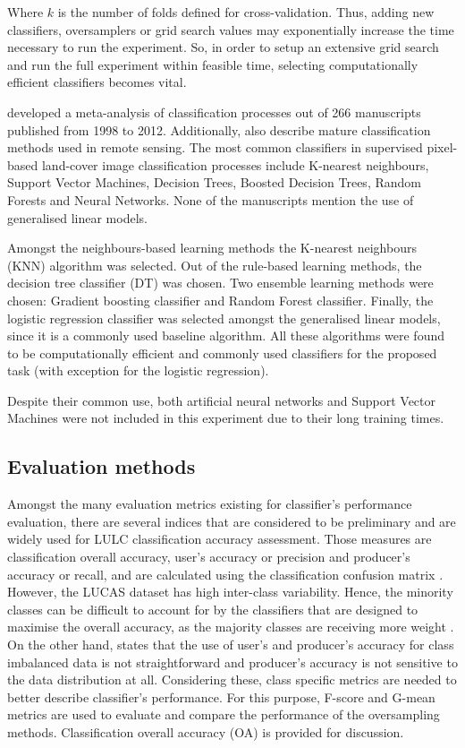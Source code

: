 \documentclass[parskip=full]{scrartcl}
\begin{document}
Where $k$ is the number of folds defined for cross-validation. Thus, adding new
classifiers, oversamplers or grid search values may exponentially increase the
time necessary to run the experiment. So, in order to setup an extensive grid
search and run the full experiment within feasible time, selecting
computationally efficient classifiers becomes vital.

\cite{Khatami2016} developed a meta-analysis of classification processes out
of 266 manuscripts published from 1998 to 2012. Additionally,
\cite{Maxwell2018} also describe mature classification methods used in remote
sensing. The most common classifiers in supervised pixel-based land-cover image
classification processes include K-nearest neighbours, Support Vector Machines,
Decision Trees, Boosted Decision Trees, Random Forests and Neural Networks.
None of the manuscripts mention the use of generalised linear models.

Amongst the neighbours-based learning methods the K-nearest neighbours (KNN)
algorithm was selected. Out of the rule-based learning methods, the decision
tree classifier (DT) was chosen. Two ensemble learning methods were chosen:
Gradient boosting classifier and Random Forest classifier. Finally, the
logistic regression classifier was selected amongst the generalised linear
models, since it is a commonly used baseline algorithm. All these algorithms
were found to be computationally efficient and commonly used classifiers for
the proposed task (with exception for the logistic regression).

Despite their common use, both artificial neural networks and Support
Vector Machines were not included in this experiment due to their long training
times.

\subsection{Evaluation methods}

Amongst the many evaluation metrics existing for classifier's performance
evaluation, there are several indices that are considered to be preliminary and
are widely used for LULC classification accuracy assessment. Those measures are
classification overall accuracy, user's accuracy or precision and
producer's accuracy or recall,  and are calculated using the classification
confusion matrix \cite{Liu2007}. However, the LUCAS dataset has high
inter-class variability. Hence, the minority classes can be difficult to
account for by the classifiers that are designed to maximise the overall
accuracy, as the majority classes are receiving more weight \cite{Inglada2017}.
On the other hand, \cite{He2008} states that the use of user's and producer's
accuracy for class imbalanced data is not straightforward and producer's
accuracy is not sensitive to the data distribution at all. Considering these,
class specific metrics are needed to better describe classifier's performance.
For this purpose, F-score and G-mean metrics are used to evaluate and compare
the performance of the oversampling methods. Classification overall accuracy
(OA) is provided for discussion.
\end{document}
